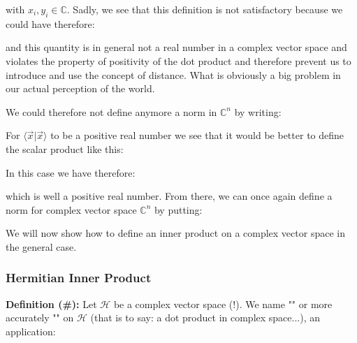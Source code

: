 	with $x_i,y_i\in \mathbb{C}$.
	Sadly, we see that this definition is not satisfactory because we could have therefore:
	
	and this quantity is in general not a real number in a complex vector space and violates the property of positivity of the dot product and therefore prevent us to introduce and use the concept of distance. What is obviously a big problem in our actual perception of the world.
	
	We could therefore not define anymore a norm in $\mathbb{C}^n$ by writing:
	
	For $\langle \vec{x}|\vec{x}\rangle$ to be a positive real number we see that it would be better to define the scalar product like this:
	
	In this case we have therefore:
	
	which is well a positive real number. From there, we can once again define a norm for complex vector space $\mathbb{C}^n$ by putting:
	
	We will now show how to define an inner product on a complex vector space in the general case.
	
	\subsubsection{Hermitian Inner Product}\label{hermitian inner product}
	\textbf{Definition (\#\mydef):} Let $\mathcal{H}$ be a complex vector space (!). We name "" or more accurately "" on $\mathcal{H}$ (that is to say: a dot product in complex space...), an application:
	
